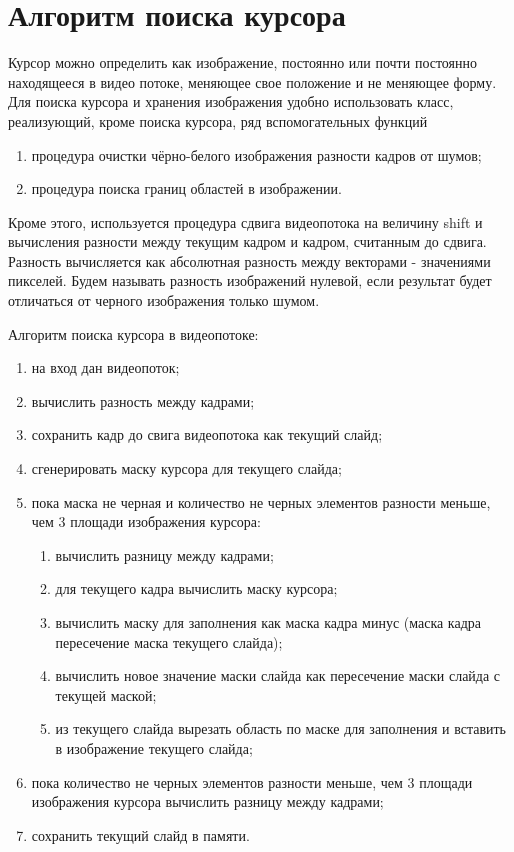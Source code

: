 \documentclass[oneside,final,14pt]{extreport}
\begin{document}
\section{Алгоритм поиска курсора}
Курсор можно определить как изображение, постоянно или почти постоянно находящееся в видео потоке, меняющее свое положение и не меняющее форму. Для поиска курсора и хранения изображения удобно использовать класс, реализующий, кроме поиска курсора, ряд вспомогательных функций

\begin{enumerate}
\item процедура очистки чёрно-белого изображения разности кадров от шумов;
\item процедура поиска границ областей в изображении.
\end{enumerate}

Кроме этого, используется процедура сдвига  видеопотока на величину shift и вычисления разности между текущим кадром и кадром, считанным до сдвига.
Разность вычисляется как абсолютная разность между векторами - значениями пикселей. Будем называть разность изображений нулевой, если результат будет отличаться от черного изображения только шумом.

Алгоритм поиска курсора в видеопотоке:

\begin{enumerate}
\item на вход дан видеопоток;
\item вычислить  разность между кадрами;
\item сохранить кадр до свига видеопотока как текущий слайд;
\item сгенерировать маску курсора для текущего слайда;
\item пока маска не черная и количество не черных элементов разности меньше, чем 3 площади изображения курсора:
\begin{enumerate}
	\item вычислить разницу между кадрами;
	\item для текущего кадра вычислить маску курсора;
	\item вычислить маску для заполнения как маска кадра минус (маска кадра пересечение маска текущего слайда);
	\item вычислить новое значение маски слайда как пересечение маски слайда с текущей маской;
	\item из текущего слайда вырезать область по маске для заполнения и вставить в изображение текущего слайда;
\end{enumerate}
\item пока количество не черных элементов разности меньше, чем 3 площади изображения курсора вычислить разницу между кадрами;
\item сохранить текущий слайд в памяти.
\end{enumerate}
\end{document}
